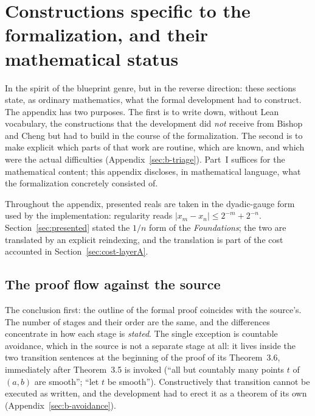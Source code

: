 \documentclass[11pt]{article}
\theoremstyle{definition}
\theoremstyle{remark}
\begin{document}
\section{Constructions specific to the formalization, and their mathematical status}
\label{sec:appendix-b}

In the spirit of the blueprint genre, but in the reverse direction: these sections state, as ordinary mathematics, what the formal development had to construct.  The appendix has two purposes.  The first is to write down, without Lean vocabulary, the constructions that the development did \emph{not} receive from Bishop and Cheng but had to build in the course of the formalization.  The second is to make explicit which parts of that work are routine, which are known, and which were the actual difficulties (Appendix~\ref{sec:b-triage}).  Part~I suffices for the mathematical content; this appendix discloses, in mathematical language, what the formalization concretely consisted of.

Throughout the appendix, presented reals are taken in the dyadic-gauge form used by the implementation: regularity reads $|x_m-x_n|\le 2^{-m}+2^{-n}$.  Section~\ref{sec:presented} stated the $1/n$ form of the \emph{Foundations}; the two are translated by an explicit reindexing, and the translation is part of the cost accounted in Section~\ref{sec:cost-layerA}.

\subsection{The proof flow against the source}
\label{sec:b-map}

The conclusion first: the outline of the formal proof coincides with the source's.  The number of stages and their order are the same, and the differences concentrate in how each stage is \emph{stated}.  The single exception is countable avoidance, which in the source is not a separate stage at all: it lives inside the two transition sentences at the beginning of the proof of its Theorem~3.6, immediately after Theorem~3.5 is invoked (``all but countably many points $t$ of $(a,b)$ are smooth''; ``let $t$ be smooth'').  Constructively that transition cannot be executed as written, and the development had to erect it as a theorem of its own (Appendix~\ref{sec:b-avoidance}).
\end{document}
